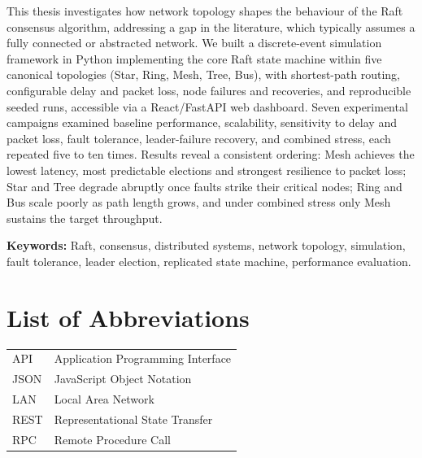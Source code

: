 \documentclass[12pt, a4paper, oneside]{report}
\begin{document}
\noindent This thesis investigates how network topology shapes the behaviour of the Raft consensus algorithm, addressing a gap in the literature, which typically assumes a fully connected or abstracted network. We built a discrete-event simulation framework in Python implementing the core Raft state machine within five canonical topologies (Star, Ring, Mesh, Tree, Bus), with shortest-path routing, configurable delay and packet loss, node failures and recoveries, and reproducible seeded runs, accessible via a React/FastAPI web dashboard. Seven experimental campaigns examined baseline performance, scalability, sensitivity to delay and packet loss, fault tolerance, leader-failure recovery, and combined stress, each repeated five to ten times. Results reveal a consistent ordering: Mesh achieves the lowest latency, most predictable elections and strongest resilience to packet loss; Star and Tree degrade abruptly once faults strike their critical nodes; Ring and Bus scale poorly as path length grows, and under combined stress only Mesh sustains the target throughput.

\textbf{Keywords:} Raft, consensus, distributed systems, network topology, simulation, fault tolerance, leader election, replicated state machine, performance evaluation.

\newpage

\tableofcontents
\newpage

\listoftables
\newpage

\listoffigures
\newpage

\chapter*{List of Abbreviations}

\begin{tabular}{ll}
API & Application Programming Interface \\
JSON & JavaScript Object Notation \\
LAN & Local Area Network \\
REST & Representational State Transfer \\
RPC & Remote Procedure Call \\
\end{tabular}

\newpage

\setcounter{page}{1}









\setlength{\bibhang}{1cm}
{\small


}
\end{document}
